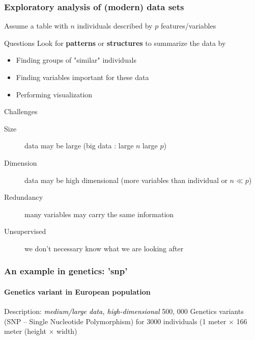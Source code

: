 \documentclass[
  ignorenonframetext,
]{beamer}
\author{}
\date{}
\begin{document}
\ifdefined\Shaded\renewenvironment{Shaded}{\begin{tcolorbox}[boxrule=0pt, sharp corners, interior hidden, frame hidden, borderline west={3pt}{0pt}{shadecolor}, breakable, enhanced]}{\end{tcolorbox}}\fi

\begin{frame}
\begin{frame}
  \frametitle{Exploratory analysis of (modern) data sets}

  Assume a table with $n$ individuals described by $p$ features/variables
  
  \vfill
  
  \begin{block}{Questions}
    Look for \alert{\bf patterns} or \alert{\bf structures} to summarize the data by
    \begin{itemize}
      \item Finding \alert{groups} of "similar" individuals
      \item Finding variables \alert{important} for these data
      \item Performing \alert{visualization}
    \end{itemize}
  \end{block}

  \vfill

  \begin{block}{Challenges}
    \begin{description}
      \item[Size] data may be \alert{large} (\og big data \og: large $n$ large $p$)    
      \item[Dimension] data may be \alert{high dimensional} (more variables than individual or $n \ll p$)    
      \item[Redundancy] many variables may carry the \alert{same information}
      \item[Unsupervised] we \alert{don't necessary know} what we are looking after
    \end{description}
  \end{block}

\end{frame}

\begin{frame}[fragile]
  \frametitle{An example in genetics: 'snp'}
  \framesubtitle{Genetics variant in European population}

\begin{block}{Description: \textcolor{black}{\it medium/large data, high-dimensional}}
500, 000 Genetics variants (SNP -- Single Nucleotide Polymorphism) for  3000 individuals
(1 meter $\times$ 166 meter (height $\times$ width)
\end{block}


\end{frame}
\end{frame}
\end{document}

